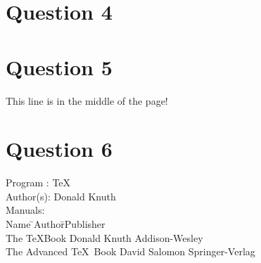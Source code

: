 \documentclass[a4paper,12pt]{article}
\begin{document}
\section{Question 4}
\pagebreak
\section{Question 5}
\newpage
\vspace*{\fill}
This line is in the middle of the page!
\vspace*{\fill}
\pagebreak
\section{Question 6}
\begin{tabbing}
Program\hspace{6mm} : \TeX \\[2mm]
Author(s)\hspace{5mm}: Donald Knuth \\[2mm]
Manuals\hspace{8mm}: \\[6mm]
\hspace{5mm}\textsf{Name} \=\hspace{40mm}\textsf{Author}\=\hspace{22mm}\textsf{Publisher} \\[3mm]

\hspace{5mm}The \TeX Book \>\hspace{40mm}Donald Knuth  \>\hspace{22mm}Addison-Wesley\\[3mm]

\hspace{5mm}The Advanced \TeX \ Book \>\hspace{40mm}David Salomon \>\hspace{22mm}Springer-Verlag
\end{tabbing}
\end{document}
